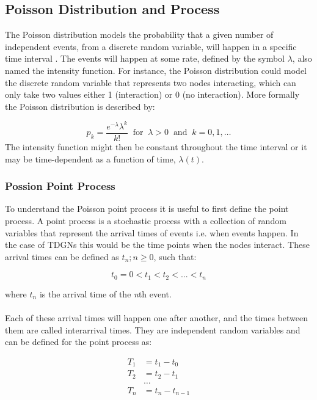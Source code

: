 \subsection{Poisson Distribution and Process}
\label{sec:Method:Possion}

The Poisson distribution models the probability that a given number of independent events, from a discrete random variable, will happen in a specific time interval \cite{PoissonScience}. 
The events will happen at some rate, defined by the symbol $\lambda$, also named the intensity function. 
For instance, the Poisson distribution could model the discrete random variable that represents two nodes interacting, which can only take two values either 1 (interaction) or 0 (no interaction).
More formally the Poisson distribution is described by:

\begin{equation}
    p_k = \frac{e^{-\lambda}\lambda^k}{k!} \;\; \text{for} \;\; \lambda > 0 \;\; \text{and} \;\; k = 0,1,\dots
\end{equation}
The intensity function might then be constant throughout the time interval or it may be time-dependent as a function of time, $\lambda(t)$.



\subsubsection{Possion Point Process}
\label{sec:Method:Possion:PossionPointProcess}

To understand the Poisson point process it is useful to first define the point process. 
A point process is a stochastic process with a collection of random variables that represent the arrival times of events i.e. when events happen. 
In the case of TDGNs this would be the time points when the nodes interact. 
These arrival times can be defined as ${t_n ; n \ge 0}$, such that:

$$
t_0 = 0 < t_1 < t_2 < ... < t_n
$$

where $t_n$ is the arrival time of the \textit{n}th event.
\\\\
Each of these arrival times will happen one after another, and the times between them are called interarrival times. 
They are independent random variables and can be defined for the point process as:

\begin{align*}
T_1 &= t_1 - t_0 \\
T_2 &= t_2 - t_1 \\
&\dots \\
T_n &= t_n - t_{n-1}
\end{align*}

